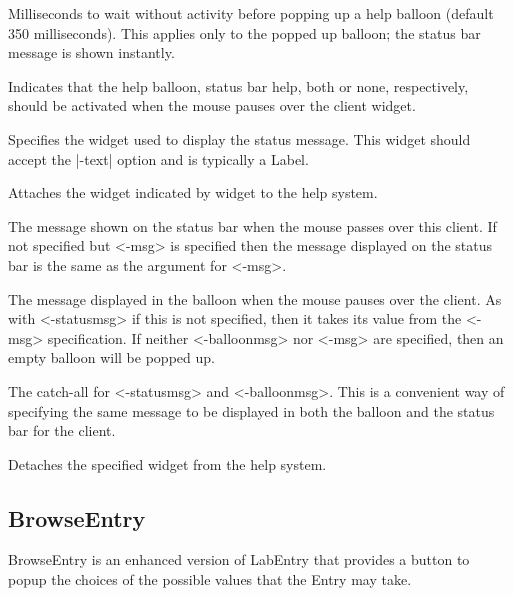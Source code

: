 \begin{enum}{1cm}

Milliseconds to wait without activity before popping up a help balloon
(default 350 milliseconds). This applies only to the popped up
balloon; the status bar message is shown instantly. 

Indicates that the help balloon, status bar help, both or none, respectively,
should be activated when the mouse pauses over the client widget. 

Specifies the widget used to display the status message. This widget should accept the
|-text| option and is typically a Label. 

\end{enum}

\vskip5pt

\begin{enum}{1cm}

Attaches the widget indicated by widget to the help system.

The message shown on the status bar when the mouse passes over this client. If not specified
but <-msg> is specified then the message displayed on the status bar is the same as the argument for <-msg>. 

The message displayed in the balloon when the mouse pauses over the client. As with <-statusmsg>
if this is not specified, then it takes its value from the <-msg> specification. If neither
<-balloonmsg> nor <-msg> are specified, then an empty balloon will be popped up.

The catch-all for <-statusmsg> and <-balloonmsg>. This is a convenient way of specifying
the same message to be displayed in both the balloon and the status bar for the client. 

Detaches the specified widget from the help system. 

\end{enum}

\subsection*{BrowseEntry}
BrowseEntry is an enhanced version of LabEntry that provides a 
button to popup the choices of the possible values that the Entry
may take.
\vskip5pt
\vspace{-4pt}

